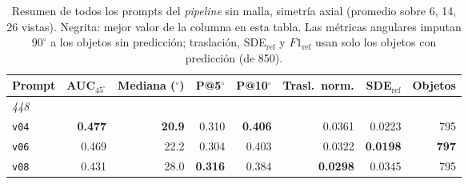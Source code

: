
\begin{table}[htbp]
\centering
\caption{Resumen de todos los prompts del \textit{pipeline} sin malla, simetría axial (promedio sobre 6, 14, 26 vistas). Negrita: mejor valor de la columna en esta tabla. Las métricas angulares imputan $90^\circ$ a los objetos sin predicción; traslación, SDE$_{\mathrm{ref}}$ y $F1_{\mathrm{ref}}$ usan solo los objetos con predicción (de 850).}
\label{tab:axis_resumen}
\begin{adjustbox}{max width=\textwidth}
\begin{tabular}{lrrrrrrr}
\toprule
Prompt & AUC$_{45^\circ}$ & Mediana ($^\circ$) & P@5$^\circ$ & P@10$^\circ$ & Trasl.\ norm. & SDE$_{\mathrm{ref}}$ & Objetos \\
\midrule
\multicolumn{8}{l}{\textit{448}} \\
\quad\texttt{v04} & \textbf{0.477} & \textbf{20.9} & 0.310 & \textbf{0.406} & 0.0361 & 0.0223 & 795 \\
\quad\texttt{v06} & 0.469 & 22.2 & 0.304 & 0.403 & 0.0322 & \textbf{0.0198} & \textbf{797} \\
\quad\texttt{v08} & 0.431 & 28.0 & \textbf{0.316} & 0.384 & \textbf{0.0298} & 0.0345 & 795 \\
\bottomrule
\end{tabular}
\end{adjustbox}
\end{table}
